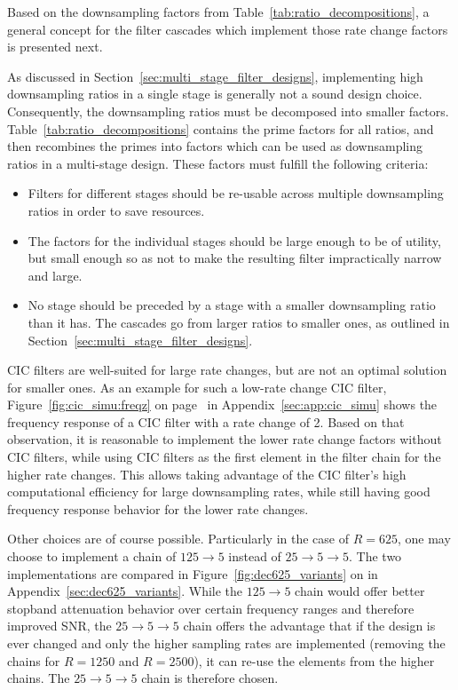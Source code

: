 Based on the downsampling factors from Table~\ref{tab:ratio_decompositions}, a
general  concept for  the filter  cascades which  implement those  rate change
factors is presented next.

As  discussed  in  Section~\ref{sec:multi_stage_filter_designs},  implementing
high downsampling  ratios in a  single stage is  generally not a  sound design
choice. Consequently, the downsampling ratios  must be decomposed into smaller
factors. Table~\ref{tab:ratio_decompositions} contains  the prime  factors for
all ratios, and then  recombines the primes into factors which  can be used as
downsampling ratios in  a multi-stage design.  These factors  must fulfill the
following criteria:
\begin{itemize}\tightlist
    \item
        Filters  for  different stages  should  be  re-usable across  multiple
        downsampling ratios  in order  to save resources.
    \item
        The factors for the individual stages  should be large enough to be of
        utility,  but small  enough so  as not  to make  the resulting  filter
        impractically narrow and large.
    \item
        No stage  should be preceded  by a  stage with a  smaller downsampling
        ratio than it has. The cascades go from larger ratios to smaller ones,
        as outlined in Section~\ref{sec:multi_stage_filter_designs}.
\end{itemize}

CIC filters  are well-suited for  large rate changes,  but are not  an optimal
solution  for smaller  ones. As  an example  for such  a  low-rate change  CIC
filter,  Figure~\ref{fig:cic_simu:freqz} on  page~\pageref{fig:cic_simu:freqz}
in  Appendix~\ref{sec:app:cic_simu}  shows the  frequency  response  of a  CIC
filter  with a  rate change  of  \num{2}.  Based  on that  observation, it  is
reasonable to  implement the  lower rate change  factors without  CIC filters,
while using  CIC filters  as the  first element  in the  filter chain  for the
higher rate  changes. This allows  taking advantage of  the CIC  filter's high
computational efficiency for large downsampling rates, while still having good
frequency response behavior for the lower rate changes.

Other choices  are of  course possible. Particularly in  the case  of $R=625$,
one  may  choose to  implement  a  chain of  $125  \rightarrow  5$ instead  of
$25  \rightarrow  5 \rightarrow  5$.   The  two implementations  are  compared
in   Figure~\ref{fig:dec625_variants}   on  \pageref{fig:dec625_variants}   in
Appendix~\ref{sec:dec625_variants}. While the $125  \rightarrow 5$ chain would
offer better stopband  attenuation behavior over certain  frequency ranges and
therefore improved SNR, the $25 \rightarrow  5 \rightarrow 5$ chain offers the
advantage that  if the  design is  ever changed and  only the  higher sampling
rates are implemented (removing the chains  for $R=1250$ and $R=2500$), it can
re-use the elements from the  higher chains. The $25 \rightarrow 5 \rightarrow
5$ chain is therefore chosen.

